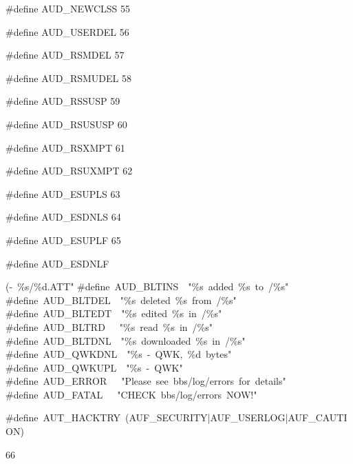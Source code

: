 \documentclass{article}
\begin{document}
\begin{cxxmacro}
{\#define}
        {AUD\_NEWCLSS}
        {}
        {}
        {55}
\end{cxxmacro}
\begin{cxxmacro}
{\#define}
        {AUD\_USERDEL}
        {}
        {}
        {56}
\end{cxxmacro}
\begin{cxxmacro}
{\#define}
        {AUD\_RSMDEL}
        {}
        {}
        {57}
\end{cxxmacro}
\begin{cxxmacro}
{\#define}
        {AUD\_RSMUDEL}
        {}
        {}
        {58}
\end{cxxmacro}
\begin{cxxmacro}
{\#define}
        {AUD\_RSSUSP}
        {}
        {}
        {59}
\end{cxxmacro}
\begin{cxxmacro}
{\#define}
        {AUD\_RSUSUSP}
        {}
        {}
        {60}
\end{cxxmacro}
\begin{cxxmacro}
{\#define}
        {AUD\_RSXMPT}
        {}
        {}
        {61}
\end{cxxmacro}
\begin{cxxmacro}
{\#define}
        {AUD\_RSUXMPT}
        {}
        {}
        {62}
\end{cxxmacro}
\begin{cxxmacro}
{\#define}
        {AUD\_ESUPLS}
        {}
        {}
        {63}
\end{cxxmacro}
\begin{cxxmacro}
{\#define}
        {AUD\_ESDNLS}
        {}
        {}
        {64}
\end{cxxmacro}
\begin{cxxmacro}
{\#define}
        {AUD\_ESUPLF}
        {}
        {}
        {65}
\end{cxxmacro}
\begin{cxxmacro}
{\#define}
        {AUD\_ESDNLF}
        {(-\ \%s/\%d.ATT"
\#define\ AUD\_BLTINS\ \ "\%s\ added\ \%s\ to\ /\%s"
\#define\ AUD\_BLTDEL\ \ "\%s\ deleted\ \%s\ from\ /\%s"
\#define\ AUD\_BLTEDT\ \ "\%s\ edited\ \%s\ in\ /\%s"
\#define\ AUD\_BLTRD\ \ \ "\%s\ read\ \%s\ in\ /\%s"
\#define\ AUD\_BLTDNL\ \ "\%s\ downloaded\ \%s\ in\ /\%s"
\#define\ AUD\_QWKDNL\ \ "\%s\ \<-\ QWK,\ \%d\ bytes"
\#define\ AUD\_QWKUPL\ \ "\%s\ -\>\ QWK"
\#define\ AUD\_ERROR\ \ \ "Please\ see\ bbs/log/errors\ for\ details"
\#define\ AUD\_FATAL\ \ \ "CHECK\ bbs/log/errors\ NOW!"


\#define\ AUT\_HACKTRY\ (AUF\_SECURITY|AUF\_USERLOG|AUF\_CAUTION)}
        {}
        {66}
\end{cxxmacro}
\end{document}
